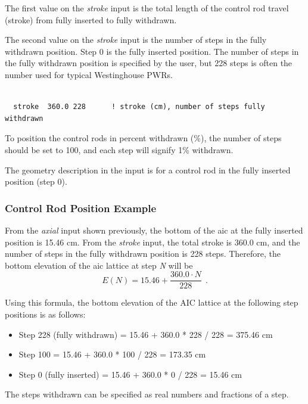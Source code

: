 The first value on the {\it stroke} input is the total length of the control rod travel (stroke)
from fully inserted to fully withdrawn.

The second value on the {\it stroke} input is the number of steps in the fully withdrawn position.
Step 0 is the fully inserted position. The number of steps in the fully withdrawn position
is specified by the user, but 228 steps is often the number used for typical Westinghouse PWRs.

\begin{Verbatim}[fontsize=\small]

  stroke  360.0 228      ! stroke (cm), number of steps fully withdrawn

\end{Verbatim}

To position the control rods in percent withdrawn (\%), the number of steps should be set to 100, and
each step will signify 1\% withdrawn.

The geometry description in the input is for a control rod in the fully inserted position (step 0).

\subsubsection{Control Rod Position Example}

From the {\it axial} input shown previously, the bottom of the \ac{aic} at the fully inserted position is 15.46 cm.
From the {\it stroke} input, the total stroke is 360.0 cm, and the number of steps in the fully withdrawn
position is 228 steps.
Therefore, the bottom elevation of the \ac{aic} lattice at step \textit{N} will be
\begin{equation}
   E(N) = 15.46 + \frac{360.0 \cdot N}{228}~~.
\end{equation}

Using this formula, the bottom elevation of the AIC lattice at the following step positions is as follows:
\begin{itemize}   %
 \item Step 228 (fully withdrawn) = 15.46 + 360.0 * 228 / 228 = 375.46 cm
 \item Step 100 = 15.46 + 360.0 * 100 / 228 = 173.35 cm
 \item Step 0 (fully inserted) = 15.46 + 360.0 * 0 / 228 = 15.46 cm
\end{itemize}

The steps withdrawn can be specified as real numbers and fractions of a step.

